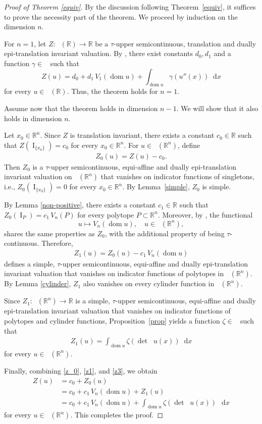 \documentclass[11pt]{article}
\theoremstyle{definition} %
\newcommand{\dif}{\mathop{}\!\mathrm{d}}
\newcommand{\RR}{(\mathbb{R}^n)}
\newcommand{\NN}{(\mathbb{R})}
\DeclareMathOperator{\I}{I}
\DeclareMathOperator{\dom}{dom}
\DeclareMathOperator{\D}{D^2}
\DeclareMathOperator{\LP}{Conv_{lp}}
\DeclareMathOperator{\conc}{Conc([0,\infty))}
\begin{document}
\begin{proof}[Proof of Theorem \ref{equiv}]
By the discussion following Theorem~\ref{equiv}, it suffices to prove the necessity part of the theorem. We proceed by induction on the dimension $n$.

For  $n=1$, let $Z:\LP(\mathbb{R})\rightarrow\mathbb{R}$ be a $\tau$-upper semicontinuous, translation and  dually epi-translation   invariant valuation. By \cite[Theorem~2]{baeta1d}, there exist  constants $d_0,d_1$ and a  function $\gamma\in\conc$ such that
$$Z(u)=d_0+d_1\,V_1(\dom u)+\int_{\dom u}\gamma (u''(x))\dif x$$
for every $u\in\LP\NN$. Thus, the theorem holds for $n=1$.  

Assume now that the theorem holds in dimension $n-1$. We will show that it also holds in dimension $n$.

Let $x_0\in\mathbb{R}^n$. Since $Z$ is translation invariant, there exists a constant $c_0\in\mathbb{R}$ such that $Z(\I_{\{x_0\}})=c_0$ for every $x_0\in\mathbb{R}^n$. For $u\in \LP\RR$, define
\begin{align}\label{z_0}
    Z_0(u)=Z(u)-c_0.
\end{align}
Then $Z_0$ is a $\tau$-upper semicontinuous, equi-affine and  dually epi-translation  invariant valuation  on $\LP\RR$ that vanishes on indicator functions of singletons, i.e.,   $Z_0(\I_{\{x_0\}})=0$ for every $x_0\in\mathbb{R}^n$.  By Lemma~\ref{simple}, $Z_0$ is simple.

By Lemma \ref{non-positive},  there exists a constant $c_1\in\mathbb{R}$ such that
$Z_0(\I_P)= c_1\,V_n(P)$ for every polytope $P\subset\mathbb{R}^n$.
 Moreover, by \cite[Lemma 6 and Lemma 9]{baeta1d}, the functional 
$$
u \mapsto V_n(\dom u), \quad u\in \LP\RR,
$$ 
shares the same properties as $Z_0$, with the additional property of being $\tau$-continuous. Therefore,
\begin{align}\label{z1}
  Z_1(u)=Z_0(u)-c_1\,V_n(\dom u)  
\end{align}
defines a simple, $\tau$-upper semicontinuous,  equi-affine and dually epi-translation invariant valuation  that vanishes on indicator functions of polytopes in $\LP\RR$. By Lemma \ref{cylinder}, $Z_1$ also vanishes on every cylinder function in $\LP\RR$.

Since $Z_1:\LP\RR\to\mathbb{R}$ is a simple, $\tau$-upper semicontinuous, equi-affine and dually epi-translation invariant valuation that vanishes on indicator functions of polytopes and cylinder functions, Proposition~\ref{prop} yields a function $\zeta\in\conc$ such that
\begin{align}\label{z3}
    Z_1(u)= \int_{\dom u}\zeta(\det \D u(x))\dif x
\end{align}
for every $u\in \LP\RR$.

Finally, combining \eqref{z_0}, \eqref{z1}, and \eqref{z3}, we obtain
\begin{align*}
Z(u)
&=c_0+Z_0(u)\\
&=c_0+c_1\,V_n(\dom u)+Z_1(u)\\
&=c_0+c_1\,V_n(\dom u)+\int_{\dom u}\zeta(\det\D u(x))\,\dif x
\end{align*}
for every $u\in\LP\RR$. This completes the proof.
\end{proof}
\end{document}
